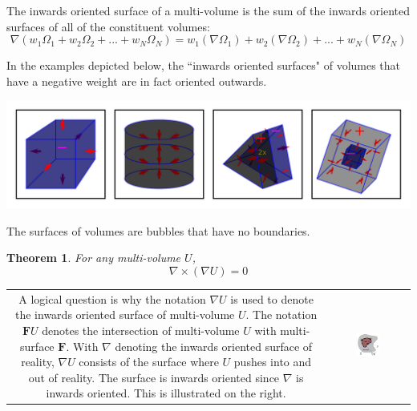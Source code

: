 \documentclass{book}
\newtheorem{thm}{Theorem}
\begin{document}
The inwards oriented surface of a multi-volume is the sum of the inwards oriented surfaces of all of the constituent volumes:
\[\nabla (w_1 \Omega_1 + w_2 \Omega_2 + ... + w_N \Omega_N)
= w_1(\nabla \Omega_1) + w_2(\nabla \Omega_2) + ... + w_N(\nabla \Omega_N)\]

In the examples depicted below, the ``inwards oriented surfaces" of volumes that have a negative weight are in fact oriented outwards.

\begin{center}
\includegraphics[width = \textwidth]{Boundaries/Volume_inwards_oriented_surfaces/volume_surface_examples_2}
\end{center}

The surfaces of volumes are bubbles that have no boundaries. 
\begin{thm}
For any multi-volume \(U\), 
\[\nabla \times (\nabla U) = 0\]
\end{thm} 

\begin{tabular}{cc}
\parbox{0.5\textwidth}{
A logical question is why the notation \(\nabla U\) is used to denote the inwards oriented surface of multi-volume \(U\). The notation \(\mathbf{F} U\) denotes the intersection of multi-volume \(U\) with multi-surface \(\mathbf{F}\). With \(\nabla\) denoting the inwards oriented surface of reality, \(\nabla U\) consists of the surface where \(U\) pushes into and out of reality. The surface is inwards oriented since \(\nabla\) is inwards oriented. This is illustrated on the right.
} & \parbox{0.3\textwidth}{
\includegraphics[width = 0.3\textwidth]{Boundaries/Volume_inwards_oriented_surfaces/surface_volume_intersections_and_volume_surfaces}
}
\end{tabular}
\end{document}
